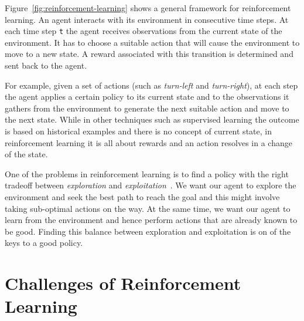 \documentclass[sigconf,review, anonymous]{acmart}
\newcommand{\todo}[1]{\textcolor{blue}{\ding{46}~{\sf todo}~#1}}
\begin{document}
Figure~\ref{fig:reinforcement-learning} shows a general framework for reinforcement learning. An agent interacts with its environment in consecutive time steps. At each time step \texttt{t} the agent receives observations from the current state of the environment. It has to choose a suitable action that will cause the environment to move to a new state. A reward associated with this transition is determined and sent back to the agent.

For example, given a set of actions (such as \emph{turn-left} and \emph{turn-right}), at each step the agent applies a certain policy to its current state and to the observations it gathers from the environment to generate the next suitable action and move to the next state. While in other techniques such as supervised learning the outcome is based on historical examples and there is no concept of current state, in reinforcement learning it is all about rewards and an action resolves in a change of the state. 

One of the problems in reinforcement learning is to find a policy with the right tradeoff between \emph{exploration} and \emph{exploitation}~\cite{Coggan:2004vb}. We want our agent to explore the environment and seek the best path to reach the goal and this might involve taking sub-optimal actions on the way. At the same time, we want our agent to learn from the environment and hence perform actions that are already known to be good. Finding this balance between exploration and exploitation is on of the keys to a good policy.


\section{Challenges of Reinforcement Learning}\label{sec:challenges}
\end{document}
